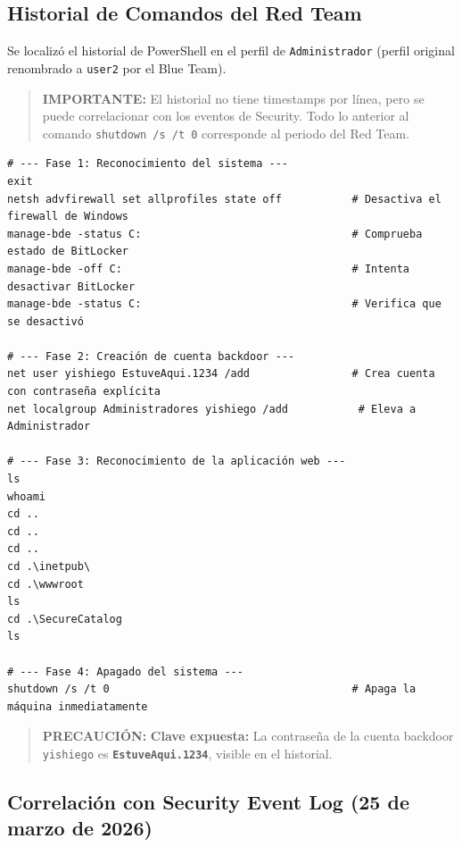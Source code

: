 \subsection{Historial de Comandos del Red Team}
Se localizó el historial de PowerShell en el perfil de \texttt{Administrador} (perfil original renombrado a \texttt{user2} por el Blue Team).

\begin{quote}
\textbf{IMPORTANTE:} El historial no tiene timestamps por línea, pero se puede correlacionar con los eventos de Security. Todo lo anterior al comando \texttt{shutdown /s /t 0} corresponde al periodo del Red Team.
\end{quote}

\begin{lstlisting}
# --- Fase 1: Reconocimiento del sistema ---
exit
netsh advfirewall set allprofiles state off           # Desactiva el firewall de Windows
manage-bde -status C:                                 # Comprueba estado de BitLocker
manage-bde -off C:                                    # Intenta desactivar BitLocker
manage-bde -status C:                                 # Verifica que se desactivó

# --- Fase 2: Creación de cuenta backdoor ---
net user yishiego EstuveAqui.1234 /add                # Crea cuenta con contraseña explícita
net localgroup Administradores yishiego /add           # Eleva a Administrador

# --- Fase 3: Reconocimiento de la aplicación web ---
ls
whoami
cd ..
cd ..
cd ..
cd .\inetpub\
cd .\wwwroot
ls
cd .\SecureCatalog
ls

# --- Fase 4: Apagado del sistema ---
shutdown /s /t 0                                      # Apaga la máquina inmediatamente
\end{lstlisting}

\begin{quote}
\textbf{PRECAUCIÓN:} \textbf{Clave expuesta:} La contraseña de la cuenta backdoor \texttt{yishiego} es \textbf{\texttt{EstuveAqui.1234}}, visible en el historial.
\end{quote}

\subsection{Correlación con Security Event Log (25 de marzo de 2026)}
